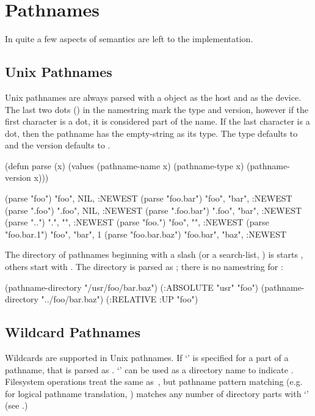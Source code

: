 \section{Pathnames}

In \clisp{} quite a few aspects of  semantics are left to
the implementation.  


\subsection{Unix Pathnames}

Unix pathnames are always parsed with a  object as the host and
 as the device.  The last two dots () in the namestring mark
the type and version, however if the first character is a dot, it is considered
part of the name.  If the last character is a dot, then the pathname has the
empty-string as its type.  The type defaults to  and the version
defaults to .

\begin{example}
(defun parse (x)
  (values (pathname-name x) (pathname-type x) (pathname-version x)))

(parse "foo") \result "foo", NIL, :NEWEST
(parse "foo.bar") \result "foo", "bar", :NEWEST
(parse ".foo") \result ".foo", NIL, :NEWEST
(parse ".foo.bar") \result ".foo", "bar", :NEWEST
(parse "..") \result ".", "", :NEWEST
(parse "foo.") \result "foo", "", :NEWEST
(parse "foo.bar.1") \result "foo", "bar", 1
(parse "foo.bar.baz") \result "foo.bar", "baz", :NEWEST
\end{example}

The directory of pathnames beginning with a slash (or a search-list,
) is starts , others start with
.  The  directory is parsed as ; there is no
namestring for :

\begin{example}
(pathname-directory "/usr/foo/bar.baz") \result (:ABSOLUTE "usr" "foo")
(pathname-directory "../foo/bar.baz") \result (:RELATIVE :UP "foo")
\end{example}


\subsection{Wildcard Pathnames}

Wildcards are supported in Unix pathnames.  If `\code{*}' is specified for a
part of a pathname, that is parsed as .  `\code{**}' can be used as a
directory name to indicate .  Filesystem operations
treat  the same as\ , but pathname pattern
matching (e.g. for logical pathname translation, )
matches any number of directory parts with `\code{**}' (see
.)

